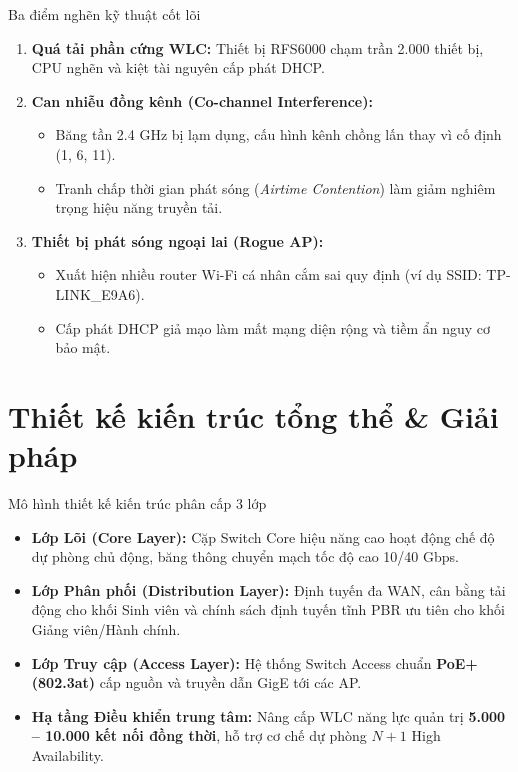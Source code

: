 \documentclass[fleqn]{beamer}
\begin{document}
\begin{frame}{Ba điểm nghẽn kỹ thuật cốt lõi}
  \begin{enumerate}
    \item \textbf{Quá tải phần cứng WLC:} Thiết bị RFS6000 chạm trần 2.000 thiết bị, CPU nghẽn và kiệt tài nguyên cấp phát DHCP.
    \item \textbf{Can nhiễu đồng kênh (Co-channel Interference):}
      \begin{itemize}\small
        \item Băng tần 2.4 GHz bị lạm dụng, cấu hình kênh chồng lấn thay vì cố định (1, 6, 11).
        \item Tranh chấp thời gian phát sóng (\textit{Airtime Contention}) làm giảm nghiêm trọng hiệu năng truyền tải.
      \end{itemize}
    \item \textbf{Thiết bị phát sóng ngoại lai (Rogue AP):}
      \begin{itemize}\small
        \item Xuất hiện nhiều router Wi-Fi cá nhân cắm sai quy định (ví dụ SSID: TP-LINK\_E9A6).
        \item Cấp phát DHCP giả mạo làm mất mạng diện rộng và tiềm ẩn nguy cơ bảo mật.
      \end{itemize}
  \end{enumerate}
\end{frame}

\section{Thiết kế kiến trúc tổng thể \& Giải pháp}

\begin{frame}{Mô hình thiết kế kiến trúc phân cấp 3 lớp}
  \begin{itemize}\small
    \item \textbf{Lớp Lõi (Core Layer):} Cặp Switch Core hiệu năng cao hoạt động chế độ dự phòng chủ động, băng thông chuyển mạch tốc độ cao 10/40 Gbps.
    \item \textbf{Lớp Phân phối (Distribution Layer):} Định tuyến đa WAN, cân bằng tải động cho khối Sinh viên và chính sách định tuyến tĩnh PBR ưu tiên cho khối Giảng viên/Hành chính.
    \item \textbf{Lớp Truy cập (Access Layer):} Hệ thống Switch Access chuẩn \textbf{PoE+ (802.3at)} cấp nguồn và truyền dẫn GigE tới các AP.
    \item \textbf{Hạ tầng Điều khiển trung tâm:} Nâng cấp WLC năng lực quản trị \textbf{5.000 -- 10.000 kết nối đồng thời}, hỗ trợ cơ chế dự phòng $N+1$ High Availability.
  \end{itemize}
\end{frame}
\end{document}
